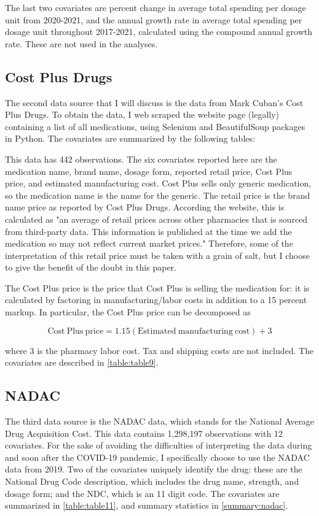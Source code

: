 \documentclass[12pt]{article}
\begin{document}
The last two covariates are percent change in average total spending per dosage unit from 2020-2021, and the annual growth rate in average total spending per dosage unit throughout 2017-2021, calculated using the compound annual growth rate. These are not used in the analyses. 

\subsection{Cost Plus Drugs}
The second data source that I will discuss is the data from Mark Cuban’s Cost Plus Drugs. To obtain the data, I web scraped the website page (legally) containing a list of all medications, using Selenium and BeautifulSoup packages in Python. The covariates are summarized by the following tables: 

This data has 442 observations. The six covariates reported here are the medication name, brand name, dosage form, reported retail price, Cost Plus price, and estimated manufacturing cost. Cost Plus sells only generic medication, so the medication name is the name for the generic. The retail price is the brand name price as reported by Cost Plus Drugs. According the website, this is calculated as "an average of retail prices across other pharmacies that is sourced from third-party data. This information is published at the time we add the medication so may not reflect current market prices." Therefore, some of the interpretation of this retail price must be taken with a grain of salt, but I choose to give the benefit of the doubt in this paper. 

The Cost Plus price is the price that Cost Plus is selling the medication for: it is calculated by factoring in manufacturing/labor costs in addition to a 15 percent markup. In particular, the Cost Plus price can be decomposed as 

\[
\mathrm{Cost\ Plus\ price}
= 1.15(\mathrm{Estimated\ manufacturing\ cost}) + 3
\]

where 3 is the pharmacy labor cost. Tax and shipping costs are not included. The covariates are described in \autoref{table:table9}.

\subsection{NADAC}
The third data source is the NADAC data, which stands for the National Average Drug Acquisition Cost. This data contains 1,298,197 observations with 12 covariates. For the sake of avoiding the difficulties of interpreting the data during and soon after the COVID-19 pandemic, I specifically choose to use the NADAC data from 2019. Two of the covariates uniquely identify the drug: these are the National Drug Code description, which includes the drug name, strength, and dosage form; and the NDC, which is an 11 digit code. The covariates are summarized in \autoref{table:table11}, and summary statistics in \autoref{summary:nadac}.
\end{document}
